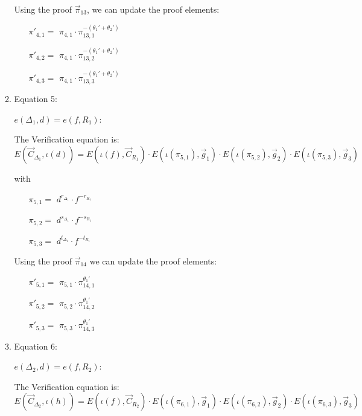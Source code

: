 \begin{description}
\begin{enumerate}
\begin{enumerate}
      Using the proof $\vec{\pi}_{13}$, we can update the proof elements:

      \begin{itemize}
      \item[$\pi'_{4,1} = $] $\pi_{4,1} \cdot \pi_{13,1}^{-(\theta_1' + \theta_2')}$
      \item[$\pi'_{4,2} = $] $\pi_{4,1} \cdot \pi_{13,2}^{-(\theta_1' + \theta_2')}$
      \item[$\pi'_{4,3} = $] $\pi_{4,1} \cdot \pi_{13,3}^{-(\theta_1' + \theta_2')}$
      \end{itemize}

    \item Equation 5:

      $e(\boxed{\Delta_1},d) = e(f, \boxed{R_1})$:
      
      The Verification equation is:  $E(\vec{C}_{\Delta_1}, \iota(d)) = E(\iota(f), \vec{C}_{R_1}) \cdot E(\iota(\pi_{5,1}), \vec{g}_1)\cdot E(\iota(\pi_{5,2}), \vec{g}_2)\cdot E(\iota(\pi_{5,3}), \vec{g}_3)$
      
      with
      \begin{itemize}
      \item[$\pi_{5,1} = $] $d^{r_{\Delta_1}} \cdot f^{-r_{R_1}}$
      \item[$\pi_{5,2} = $] $d^{s_{\Delta_1}} \cdot f^{-s_{R_1}}$
      \item[$\pi_{5,3} = $] $d^{t_{\Delta_1}} \cdot f^{-t_{R_1}}$
      \end{itemize}

      Using the proof $\vec{\pi}_{14}$ we can update the proof elements:
      \begin{itemize}
      \item[$\pi'_{5,1} = $] $\pi_{5,1} \cdot \pi_{14,1}^{\theta_1'}$
      \item[$\pi'_{5,2} = $] $\pi_{5,2} \cdot \pi_{14,2}^{\theta_1'}$
      \item[$\pi'_{5,3} = $] $\pi_{5,3} \cdot \pi_{14,3}^{\theta_1'}$
      \end{itemize}

    \item Equation 6:

      $e(\boxed{\Delta_2},d) = e(f, \boxed{R_2})$:

      The Verification equation is:  $E(\vec{C}_{\Delta_2}, \iota(h)) = E(\iota(f), \vec{C}_{R_2}) \cdot E(\iota(\pi_{6,1}), \vec{g}_1)\cdot E(\iota(\pi_{6,2}), \vec{g}_2)\cdot E(\iota(\pi_{6,3}), \vec{g}_3)$


\end{enumerate}
\end{enumerate}
\end{description}
